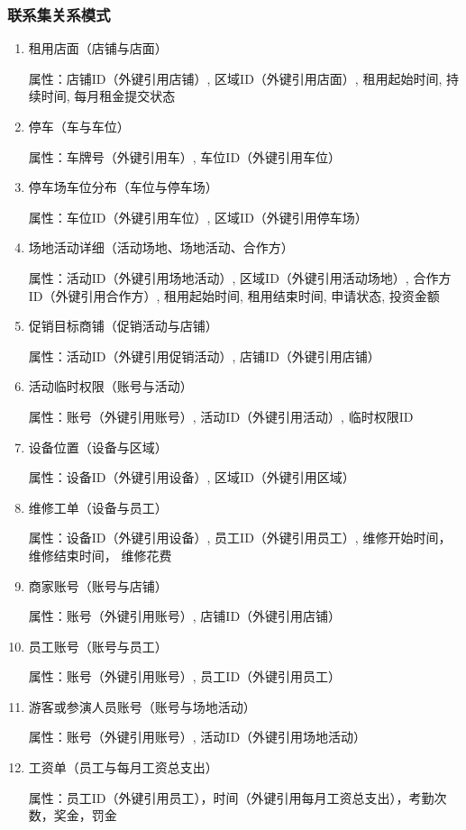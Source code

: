 \documentclass[]{article}
\providecommand{\tightlist}{%
  \setlength{\itemsep}{0pt}\setlength{\parskip}{0pt}}
\begin{document}
\hypertarget{ux8054ux7cfbux96c6ux5173ux7cfbux6a21ux5f0f}{%
\subsubsection{联系集关系模式}\label{ux8054ux7cfbux96c6ux5173ux7cfbux6a21ux5f0f}}

\begin{enumerate}
\def\labelenumi{\arabic{enumi}.}
\tightlist
\item
  租用店面（店铺与店面）

  属性：店铺ID（外键引用店铺）, 区域ID（外键引用店面）, 租用起始时间, 持续时间,
  每月租金提交状态
\item
  停车（车与车位）

  属性：车牌号（外键引用车）, 车位ID（外键引用车位）
\item
  停车场车位分布（车位与停车场）

  属性：车位ID（外键引用车位）, 区域ID（外键引用停车场）
\item
  场地活动详细（活动场地、场地活动、合作方）

  属性：活动ID（外键引用场地活动）, 区域ID（外键引用活动场地）,
  合作方ID（外键引用合作方）, 租用起始时间, 租用结束时间, 申请状态, 投资金额
\item
  促销目标商铺（促销活动与店铺）

  属性：活动ID（外键引用促销活动）, 店铺ID（外键引用店铺）
\item
  活动临时权限（账号与活动）

  属性：账号（外键引用账号）, 活动ID（外键引用活动）, 临时权限ID
\item
  设备位置（设备与区域）

  属性：设备ID（外键引用设备）, 区域ID（外键引用区域）
\item
  维修工单（设备与员工）

  属性：设备ID（外键引用设备）, 员工ID（外键引用员工）, 维修开始时间，维修结束时间，
  维修花费
\item
  商家账号（账号与店铺）

  属性：账号（外键引用账号）, 店铺ID（外键引用店铺）
\item
  员工账号（账号与员工）

  属性：账号（外键引用账号）, 员工ID（外键引用员工）
\item
  游客或参演人员账号（账号与场地活动）

  属性：账号（外键引用账号）, 活动ID（外键引用场地活动）
\item
  工资单（员工与每月工资总支出）

  属性：员工ID（外键引用员工），时间（外键引用每月工资总支出），考勤次数，奖金，罚金
\end{enumerate}
\end{document}
